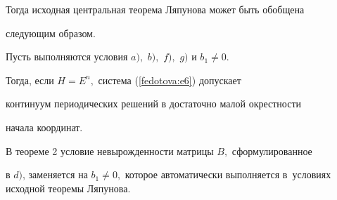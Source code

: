 Тогда исходная центральная теорема Ляпунова может быть обобщена

следующим образом.

\begin{theorem}[2]

Пусть выполняются условия $a),$ $b),$ $f),$ $g)$ и $b_1\neq0$.

Тогда, если $H=E^n,$ система {\rm (\ref{fedotova:e6})} допускает

континуум периодических решений в достаточно малой окрестности

начала координат.

\end{theorem}

\begin{remark}

В теореме 2 условие невырожденности матрицы $B,$ сформулированное

в $d)$, заменяется на $b_1\neq0,$ которое автоматически выполняется в~условиях исходной теоремы Ляпунова.

\end{remark}

